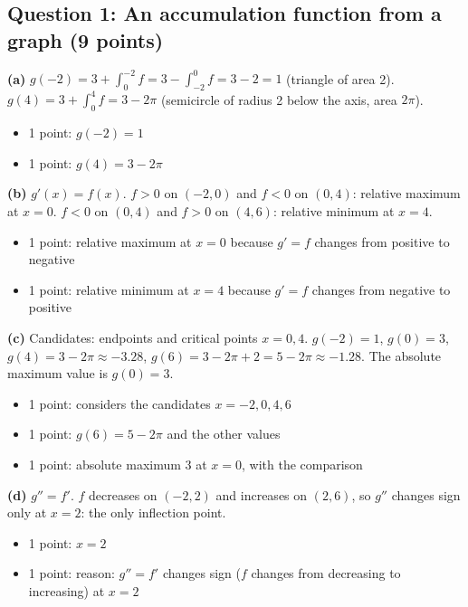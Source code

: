 \documentclass{apcalc}
\begin{document}
\subsection*{Question 1: An accumulation function from a graph (9 points)}
\textbf{(a)} $g(-2)=3+\int_0^{-2}f=3-\int_{-2}^0f=3-2=1$ (triangle of area 2). $g(4)=3+\int_0^4f=3-2\pi$ (semicircle of radius 2 below the axis, area $2\pi$).
\begin{itemize}[leftmargin=1.6em,itemsep=0pt]
\item 1 point: $g(-2)=1$
\item 1 point: $g(4)=3-2\pi$
\end{itemize}
\textbf{(b)} $g'(x)=f(x)$. $f>0$ on $(-2,0)$ and $f<0$ on $(0,4)$: relative maximum at $x=0$. $f<0$ on $(0,4)$ and $f>0$ on $(4,6)$: relative minimum at $x=4$.
\begin{itemize}[leftmargin=1.6em,itemsep=0pt]
\item 1 point: relative maximum at $x=0$ because $g'=f$ changes from positive to negative
\item 1 point: relative minimum at $x=4$ because $g'=f$ changes from negative to positive
\end{itemize}
\textbf{(c)} Candidates: endpoints and critical points $x=0,4$. $g(-2)=1$, $g(0)=3$, $g(4)=3-2\pi\approx-3.28$, $g(6)=3-2\pi+2=5-2\pi\approx-1.28$. The absolute maximum value is $g(0)=3$.
\begin{itemize}[leftmargin=1.6em,itemsep=0pt]
\item 1 point: considers the candidates $x=-2,0,4,6$
\item 1 point: $g(6)=5-2\pi$ and the other values
\item 1 point: absolute maximum 3 at $x=0$, with the comparison
\end{itemize}
\textbf{(d)} $g''=f'$. $f$ decreases on $(-2,2)$ and increases on $(2,6)$, so $g''$ changes sign only at $x=2$: the only inflection point.
\begin{itemize}[leftmargin=1.6em,itemsep=0pt]
\item 1 point: $x=2$
\item 1 point: reason: $g''=f'$ changes sign ($f$ changes from decreasing to increasing) at $x=2$
\end{itemize}
\end{document}

